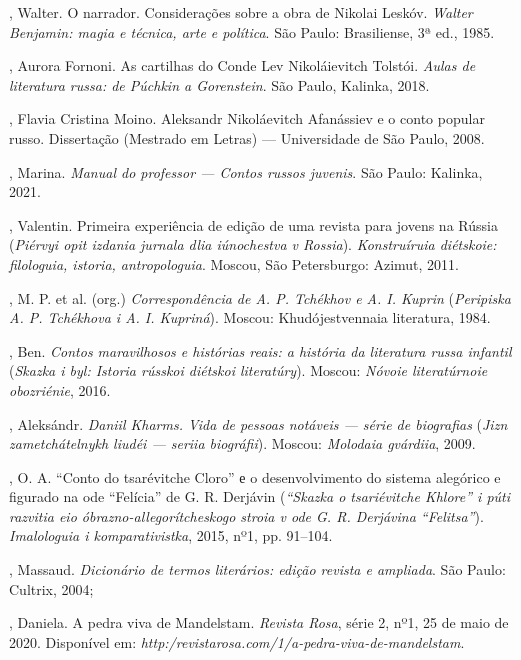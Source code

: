 \begin{bibliohedra}

, Walter. O narrador. Considerações sobre a obra de Nikolai Leskóv. \textit{Walter Benjamin: magia e técnica, arte e política}. São Paulo: Brasiliense, 3ª ed., 1985.

, Aurora Fornoni. As cartilhas do Conde Lev Nikoláievitch Tolstói. \textit{Aulas de literatura russa: de Púchkin a Gorenstein}. São Paulo, Kalinka, 2018.

, Flavia Cristina Moino. Aleksandr Nikoláevitch Afanássiev e o conto popular russo. Dissertação (Mestrado em Letras) — Universidade de São Paulo, 2008.

, Marina. \textit{Manual do professor — Contos russos juvenis}. São Paulo: Kalinka, 2021.

, Valentin. Primeira experiência de edição de uma revista para jovens na Rússia (\textit{Piérvyi opit izdania jurnala dlia iúnochestva v Rossia}). \textit{Konstruíruia diétskoie: filologuia, istoria, antropologuia}. Moscou, São Petersburgo: Azimut, 2011.

, M. P. et al. (org.) \textit{Correspondência de A. P. Tchékhov e A. I. Kuprin} (\textit{Peripiska A. P. Tchékhova i A. I. Kupriná}). Moscou: Khudójestvennaia literatura, 1984.

, Ben. \textit{Contos maravilhosos e histórias reais: a história da literatura russa infantil} (\textit{Skazka i byl: Istoria rússkoi diétskoi literatúry}). Moscou: \textit{Nóvoie literatúrnoie obozriénie}, 2016.

, Aleksándr. \textit{Daniil Kharms. Vida de pessoas notáveis — série de biografias} (\textit{Jizn zametchátelnykh liudéi — seriia biográfii}). Moscou: \textit{Molodaia gvárdiia}, 2009.

, O. A. “Conto do tsarévitche Cloro” е o desenvolvimento do sistema alegórico e figurado na ode “Felícia” de G. R. Derjávin (\textit{“Skazka o tsariévitche Khlore” i púti razvitia eio óbrazno-allegorítcheskogo stroia v ode G. R. Derjávina “Felitsa”}). \textit{Imalologuia i komparativistka}, 2015, nº1, pp. 91–104.

, Massaud. \textit{Dicionário de termos literários: edição revista e ampliada}. São Paulo: Cultrix, 2004;

, Daniela. A pedra viva de Mandelstam. \textit{Revista Rosa}, série 2, nº1, 25 de maio de 2020. Disponível em: \textit{http:/revistarosa.com/1/a-pedra-viva-de-mandelstam}.


\end{bibliohedra}
